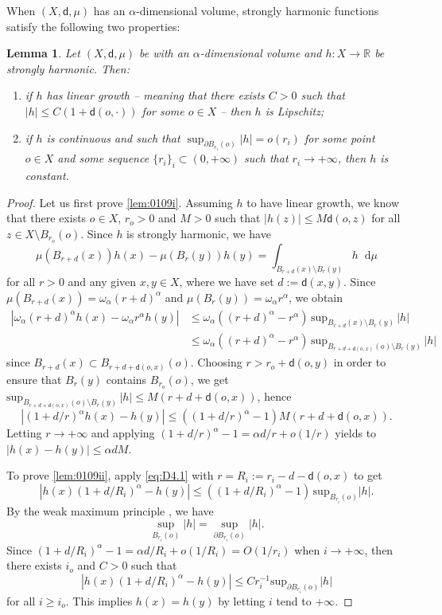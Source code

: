 \documentclass[10pt]{amsart}
\newenvironment{enumeratei}
{\bgroup\def\theenumi{\roman{enumi}}\def\theenumii{\arabic{enumii}}\begin{enumerate}}
{\end{enumerate}\egroup}
\let\backslash\setminus
\theoremstyle{plain}
\newtheorem{lemma}[theorem]{Lemma}
\theoremstyle{definition}
\newcommand{\setR}{\mathbb{R}}
\newcommand{\di}{\mathop{}\!\mathrm{d}}
\newcommand{\dist}{\mathsf{d}}
\begin{document}
When $(X,\dist,\mu)$ has an $\alpha$-dimensional volume, strongly harmonic functions satisfy the following two properties:

\begin{lemma}\label{lem:0109}
Let $(X,\dist,\mu)$ be with an $\alpha$-dimensional volume and $h:X\to\setR$ be strongly harmonic. Then:
\begin{enumeratei}
\item\label{lem:0109i}
if $h$ has linear growth -- meaning that there exists $C>0$ such that $|h|\le C(1+\dist(o,\cdot))$ for some $o \in X$ -- then $h$ is Lipschitz;
\item\label{lem:0109ii}
if $h$ is continuous and such that $\sup_{\partial B_{r_i}(o)} |h| =o(r_i)$ for some point $o \in X$ and some sequence $\{r_i\}_i \subset (0,+\infty)$ such that $r_i \to +\infty$, then $h$ is constant.
\end{enumeratei}
\end{lemma}

\begin{proof}
Let us first prove \eqref{lem:0109i}. Assuming $h$ to have linear growth, we know that there exists $o \in X$, $r_o>0$ and $M>0$ such that $|h(z)| \le M\dist(o,z)$ for all $z \in X \backslash B_{r_o}(o)$. Since $h$ is strongly harmonic, we have
\[
\mu(B_{r+d}(x)) h(x) - \mu(B_r(y)) h(y) = \int_{B_{r+d}(x) \backslash B_r(y)} h \di \mu
\]
for all $r>0$ and any given $x,y \in X$, where we have set $d:=\dist(x,y)$. Since $\mu(B_{r+d}(x)) = \omega_\alpha (r+d)^\alpha$ and $\mu(B_r(y)) = \omega_\alpha r^\alpha$, we obtain
\begin{equation}\label{eq:D4.1}
\begin{aligned}
|\omega_\alpha (r+d)^\alpha h(x) - \omega_\alpha r^\alpha h(y)| & \le \omega_\alpha ((r+d)^\alpha - r^\alpha)\, \mathrm{sup}_{B_{r+d}(x)\backslash B_r(y)} \, |h| \\
& \le \omega_\alpha ((r+d)^\alpha - r^\alpha) \, \mathrm{sup}_{B_{r+d+\dist(o,x)}(o)\backslash B_r(y)} \, |h|
\end{aligned}
\end{equation}
since $B_{r+d}(x) \subset B_{r+d+\dist(o,x)}(o)$. Choosing $r>r_o+\dist(o,y)$ in order to ensure that $B_r(y)$ contains $B_{r_o}(o)$, we get $ \mathrm{sup}_{B_{r+d+\dist(o,x)}(o)\backslash B_r(y)} \, |h| \le M(r+d+\dist(o,x))$,
hence
\[
|(1+d/r)^\alpha h(x) - h(y)| \le ((1+d/r)^\alpha-1)M(r+d+\dist(o,x)).
\]
Letting $r \to +\infty$ and applying $(1+d/r)^\alpha-1 =\alpha d/r +o(1/r)$ yields to $|h(x) - h(y)| \le \alpha dM$.

To prove \eqref{lem:0109ii}, apply \eqref{eq:D4.1} with $r=R_i:=r_i-d-\dist(o,x)$ to get
\[
\left| h(x) (1+d/R_i)^\alpha - h(y)\right| \le ((1+d/R_i)^\alpha-1) \,\mathrm{sup}_{B_{r_i}(o)} |h|.
\]
By the weak maximum principle \cite[Cor.\,4.3]{AGG19}, we have
\[
\sup_{B_{r_i}(o)} |h| = \sup_{\partial B_{r_i}(o)} |h|.
\]
Since $(1+d/R_i)^\alpha-1= \alpha d/ R_i + o(1/R_i) = O(1/r_i)$ when $i\to +\infty$, then there exists $i_o$ and $C>0$ such that
\[
\left| h(x) (1+d/R_i)^\alpha - h(y)\right| \le C r_i^{-1}\mathrm{sup}_{\partial B_{r_i}(o)} |h|
\]
for all $i \ge i_o$. This implies $h(x)=h(y)$ by letting $i$ tend to $+\infty$.
\end{proof}
\end{document}
